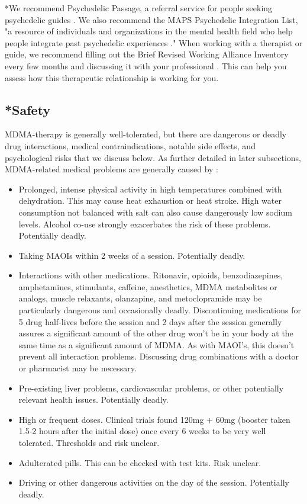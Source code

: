 \documentclass[12pt,letterpaper]{article}
\begin{document}
*We recommend Psychedelic Passage, a referral service for people seeking psychedelic guides \cite{psychedelicPassage}. We also recommend the MAPS Psychedelic Integration List, "a resource of individuals and organizations in the mental health field who help people integrate past psychedelic experiences \cite{mapsIntegrationList}." When working with a therapist or guide, we recommend filling out the Brief Revised Working Alliance Inventory every few months and discussing it with your professional \cite{BRWAIdownload,mallinckrodtBRWAI}. This can help you assess how this therapeutic relationship is working for you.
\subsection{*Safety}
\label{sec:safety}
MDMA-therapy is generally well-tolerated, but there are dangerous or deadly drug interactions, medical contraindications, notable side effects, and psychological risks that we discuss below. As further detailed in later subsections, MDMA-related medical problems are generally caused by \cite{riggDeaths,roxburghDeaths}:
\begin{itemize}
    \item Prolonged, intense physical activity in high temperatures combined with dehydration. This may cause heat exhaustion or heat stroke. High water consumption not balanced with salt can also cause dangerously low sodium levels. Alcohol co-use strongly exacerbates the risk of these problems. Potentially deadly.
    \item Taking MAOIs within 2 weeks of a session. Potentially deadly.
    \item Interactions with other medications. Ritonavir, opioids, benzodiazepines, amphetamines, stimulants, caffeine, anesthetics, MDMA metabolites or analogs, muscle relaxants, olanzapine, and metoclopramide may be particularly dangerous and occasionally deadly. Discontinuing medications for 5 drug half-lives before the session and 2 days after the session generally assures a significant amount of the other drug won't be in your body at the same time as a significant amount of MDMA. As with MAOI's, this doesn't prevent all interaction problems. Discussing drug combinations with a doctor or pharmacist may be necessary.
    \item Pre-existing liver problems, cardiovascular problems, or other potentially relevant health issues. Potentially deadly.
    \item High or frequent doses. Clinical trials found 120mg + 60mg (booster taken 1.5-2 hours after the initial dose) once every 6 weeks to be very well tolerated. Thresholds and risk unclear.
    \item Adulterated pills. This can be checked with test kits. Risk unclear.
    \item Driving or other dangerous activities on the day of the session. Potentially deadly.
\end{itemize}
\end{document}
